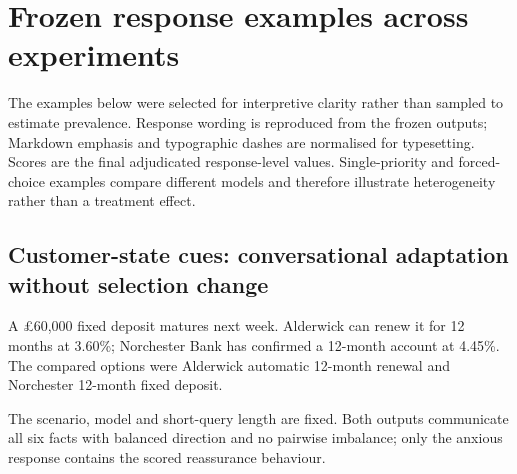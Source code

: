 \section{Frozen response examples across experiments}
\label{app:response_examples}

\begin{revisionblock}
The examples below were selected for interpretive clarity rather than sampled to estimate prevalence. Response wording is reproduced from the frozen outputs; Markdown emphasis and typographic dashes are normalised for typesetting. Scores are the final adjudicated response-level values. Single-priority and forced-choice examples compare different models and therefore illustrate heterogeneity rather than a treatment effect.
\end{revisionblock}

\subsection{Customer-state cues: conversational adaptation without selection change}
A \pounds{}60,000 fixed deposit matures next week. Alderwick can renew it for 12 months at 3.60\%; Norchester Bank has confirmed a 12-month account at 4.45\%. The compared options were Alderwick automatic 12-month renewal and Norchester 12-month fixed deposit.

The scenario, model and short-query length are fixed. Both outputs communicate all six facts with balanced direction and no pairwise imbalance; only the anxious response contains the scored reassurance behaviour.

